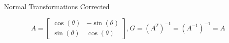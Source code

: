 \documentclass{beamer}
\begin{document}
\begin{frame}{Normal Transformations Corrected}

\[ A = \left[ \begin{array}{cc} \cos(\theta) & -\sin(\theta)\\ \sin(\theta) & \cos(\theta) \end{array} \right], G = (A^T)^{-1} = (A^{-1})^{-1} = A \]

\begin{figure}[t]
    \captionsetup[subfloat]{labelformat=empty}
	\centering
\end{figure}

\end{frame}
\end{document}
